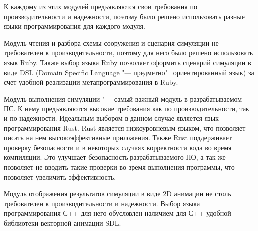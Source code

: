 К каждому из этих модулей предъявляются свои требования по производительности и надежности, поэтому было решено использовать разные языки программирования для каждого модуля.

Модуль чтения и разбора схемы сооружения и сценария симуляции не требователен к производительности, поэтому для него было решено использовать язык Ruby.
Также выбор языка Ruby позволяет оформить сценарий симуляции в виде DSL (Domain Specific Language "--- предметно"=ориентированный язык) за счет удобной реализации метапрограммирования в Ruby.

Модуль выполнения симуляции "--- самый важный модуль в разрабатываемом ПС. К нему предъявляются высокие требования как по производительности, так и по надежности.
Идеальным выбором в данном случае является язык программирования Rust. Rust является низкоуровневым языком, что позволяет писать на нем высокоэффективные приложения.
Также Rust поддерживает проверку безопасности и в некоторых случаях корректности кода во время компиляции.
Это улучшает безопасность разрабатываемого ПО, а так же позволяет не вводить такие проверки во время выполнения программы, что позволяет увеличить эффективность.

Модуль отображения результатов симуляции в виде 2D анимации не столь требователен к производительности и надежности.
Выбор языка программирования С++ для него обусловлен наличием для С++ удобной библиотеки векторной анимации SDL.
